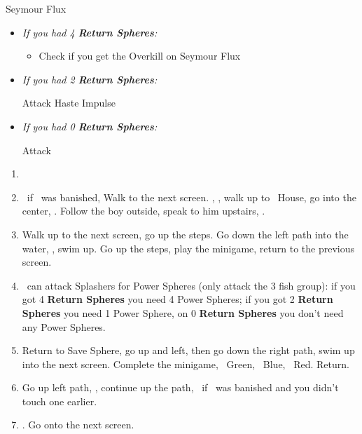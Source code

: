 \begin{battle}[70000]{Seymour Flux}
    \begin{itemize}
        \item \textit{If you had 4 \textbf{Return Spheres}:}
        \begin{itemize}
            \yunaf Attack
            \tidusf Haste \yuna
            \switch{\auron}{\rikku}
            \rikkuf \textit{If \od} Mix HP Sphere + Grenade, \textit{else} Silence Grenade
            \summon{\bahamut}
            \bahamutf \textit{If you used a Silence Grenade} Impulse, otherwise Attack
            \yunaf Attack
            \tidusf \textit{If you used a Silence Grenade} Attack once, otherwise Defend
            \rikkuf Defend
            \item Check if you get the Overkill on Seymour Flux
        \end{itemize}
        \item \textit{If you had 2 \textbf{Return Spheres}:}
        \begin{itemize}
            \yunaf Attack
            \tidusf Haste \yuna
            \summon{\bahamut}
            \bahamutf Impulse
        \end{itemize}
        \item \textit{If you had 0 \textbf{Return Spheres}:}
        \begin{itemize}
            \switch{\tidus}{\yuna}
            \summon{\bahamut}
            \bahamutf Attack
        \end{itemize}
    \end{itemize}
\end{battle}
\begin{enumerate}[resume]
    \item \formation{\tidus}{\kimahri}{\auron}
    \item \save\ if \bahamut\ was banished, Walk to the next screen. \skippablefmv[0:20], \sd, walk up to \tidus\ House, go into the center, \sd. Follow the boy outside, speak to him upstairs, \sd.
    \item Walk up to the next screen, go up the steps. Go down the left path into the water, \sd, swim up. Go up the steps, play the minigame, return to the previous screen.
    \item \tidus\ can attack Splashers for Power Spheres (only attack the 3 fish group): if you got 4 \textbf{Return Spheres} you need 4 Power Spheres; if you got 2 \textbf{Return Spheres} you need 1 Power Sphere, on 0 \textbf{Return Spheres} you don't need any Power Spheres.
    \item Return to Save Sphere, go up and left, then go down the right path, swim up into the next screen. Complete the minigame, \rikku\ Green, \tidus\ Blue, \wakka\ Red. Return.
    \item Go up left path, \sd, continue up the path, \save\ if \bahamut\ was banished and you didn't touch one earlier.
    \item \formation{\tidus}{\yuna}{\wakka}. Go onto the next screen.
\end{enumerate}
